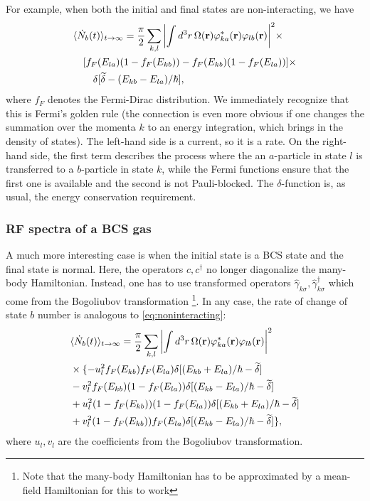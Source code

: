 \documentclass[reprint,
nofootinbib,
amsmath,amssymb,
aps]{revtex4-1}
\newcommand{\f}[2]{\frac{#1}{#2}}
\begin{document}
For example, when both the initial and final states are non-interacting, we have
\begin{align}
\label{eq:noninteracting}
&\langle \dot N_b(t) \rangle_{t\to \infty}
= \f{\pi}{2} \sum_{k,l} \abs{ \int d^3 r\,  \Omega(\mathbf{r}) \varphi_{ka}^*(\mathbf{r}) \varphi_{lb} (\mathbf{r})}^2  \times \nonumber\\
&\quad [f_F(E_{la}) ( 1 - f_F(E_{kb})) - f_F(E_{kb})(1 - f_F(E_{la}))] \times \nonumber\\
&\quad\quad \delta[\widetilde{\delta} - (E_{kb} - E_{la})/\hbar],
\end{align}
where $f_F$ denotes the Fermi-Dirac distribution. We immediately recognize that this is Fermi's golden rule (the connection is even more obvious if one changes the summation over the momenta $k$ to an energy integration, which brings in the density of states). The left-hand side is a current, so it is a rate. On the right-hand side, the first term describes the process where the an $a$-particle in state $l$ is transferred to a $b$-particle in state $k$, while the Fermi functions ensure that the first one is available and the second is not Pauli-blocked. The $\delta$-function is, as usual,  the energy conservation requirement. 

\subsubsection{RF spectra of a BCS gas}\label{sec:rf}

A much more interesting case is when the initial state is a BCS state and the final state is normal. Here, the operators $c,c^\dagger$ no longer diagonalize the many-body Hamiltonian. Instead, one has to use transformed operators $\hat{\gamma}_{k\sigma}, \hat{\gamma}^\dagger_{k\sigma}$ which come from the Bogoliubov transformation \footnote{Note that the many-body Hamiltonian has to be approximated by a mean-field Hamiltonian for this to work}. In any case, the rate of change of state $b$ number is analogous to \eqref{eq:noninteracting}:
\begin{align*}
&\langle \dot N_b(t) \rangle_{t\to \infty} 
= \f{\pi}{2} \sum_{k,l} \abs{ \int d^3 r\,  \Omega(\mathbf{r}) \varphi_{ka}^*(\mathbf{r}) \varphi_{lb} (\mathbf{r})}^2   \nonumber \\
& \times \{   -u_l^2 f_F(E_{kb}) f_F(E_{la}) \delta[(E_{kb} + E_{la})/\hbar - \widetilde{\delta}]\nonumber \\
& -v_l^2 f_F(E_{kb}) (1 - f_F(E_{la})) \delta[(E_{kb} - E_{la})/\hbar - \widetilde{\delta}] \nonumber \\
& +u_l^2 (1 - f_F(E_{kb})) (1 - f_F(E_{la})) \delta[(E_{kb} + E_{la})/\hbar - \widetilde{\delta}]\nonumber \\
& + v_l^2  (1 - f_F(E_{kb})) f_F(E_{la})  \delta[(E_{kb} - E_{la})/\hbar - \widetilde{\delta}] 
\},
\end{align*}
where $u_l, v_l$ are the coefficients from the Bogoliubov transformation.  
 
\end{document}
